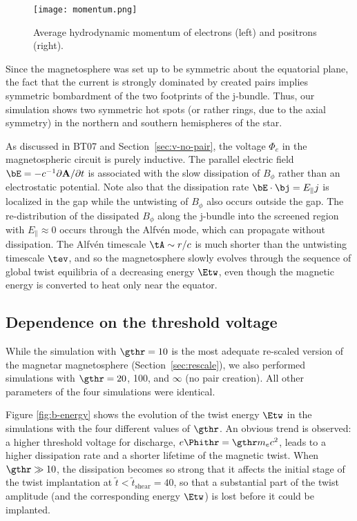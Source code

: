 \begin{figure*}[t]
  \centering
  \texttt{[image: momentum.png]}
  \caption{Average hydrodynamic momentum of electrons (left) and positrons (right).}
  \label{fig:momenta}
\end{figure*}


Since the magnetosphere was set up to be symmetric about the equatorial plane,
the fact that the current is strongly dominated by created pairs  implies
symmetric bombardment of the two footprints of the j-bundle. Thus, our simulation
shows two symmetric hot spots (or rather rings, due to the axial symmetry) in the
northern and southern hemispheres of the star.

As discussed in BT07 and Section~\ref{sec:v-no-pair}, the voltage $\Phi_e$ in
the magnetospheric circuit is purely inductive. The parallel electric field
$\bE= -c^{-1}\partial \mathbf{A}/\partial t$ is associated with the slow
dissipation of $B_{\phi}$ rather than an electrostatic potential.
Note also that the dissipation rate $\bE\cdot\bj=E_\parallel j$ is localized in the
gap while the untwisting of $B_\phi$ also occurs outside the gap. The re-distribution of the
dissipated $B_\phi$ along the j-bundle into the screened region with $E_\parallel\approx 0$
occurs through the Alfv\'en mode, which can propagate without dissipation.
The Alfv\'en timescale $\tA\sim r/c$ is much shorter than the untwisting timescale $\tev$,
and so the magnetosphere slowly evolves through the sequence of global twist equilibria
of a decreasing energy
$\Etw$,
even though the magnetic energy is converted to heat only
near the equator.


\subsection{Dependence on the threshold voltage}
\label{sec:voltage}


While the simulation with $\gthr=10$ is the most adequate re-scaled version of the
magnetar magnetosphere (Section~\ref{sec:rescale}), we also performed simulations with
$\gthr=20$, 100, and $\infty$ (no pair creation). All other parameters of the four
simulations were identical.

Figure \ref{fig:b-energy} shows the evolution of the twist energy $\Etw$
in the simulations with the four different values of $\gthr$. An obvious trend is observed:
a higher threshold voltage for discharge, $e\Phithr=\gthr m_ec^2$, leads to a higher
dissipation rate and a shorter lifetime of the magnetic twist. When $\gthr\gg 10$,
the dissipation becomes so strong that it affects the initial stage of the twist
implantation at $\tilde{t}<\tilde{t}_\mathrm{shear}=40$, so that a substantial part of the twist amplitude
(and the corresponding energy $\Etw$) is lost before it could be implanted.


